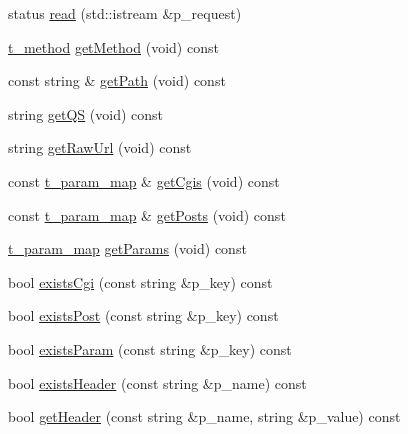 \begin{DoxyCompactItemize}
\item 
status \hyperlink{classxtd_1_1network_1_1http_1_1Request_a050758a8848fb4190b305d955760fd79}{read} (std\-::istream \&p\-\_\-request)
\item 
\hyperlink{classxtd_1_1network_1_1http_1_1Request_a789d6d688af4e63cc725542fc7925627}{t\-\_\-method} \hyperlink{classxtd_1_1network_1_1http_1_1Request_af06004afe64f465edfb281407b7f3600}{get\-Method} (void) const 
\item 
const string \& \hyperlink{classxtd_1_1network_1_1http_1_1Request_a0006f0a88dccabdafe9dfed3627730f6}{get\-Path} (void) const 
\item 
string \hyperlink{classxtd_1_1network_1_1http_1_1Request_ac9aeee4365089901bd216350fdcbe3a2}{get\-Q\-S} (void) const 
\item 
string \hyperlink{classxtd_1_1network_1_1http_1_1Request_a00428c206d17d2557d5ed3a46a2f139b}{get\-Raw\-Url} (void) const 
\item 
const \hyperlink{classxtd_1_1network_1_1http_1_1Request_a3cd6e9ac7c35897002582c4a3b84b17d}{t\-\_\-param\-\_\-map} \& \hyperlink{classxtd_1_1network_1_1http_1_1Request_a48687de33ff80c714d6bc0112aa23c56}{get\-Cgis} (void) const 
\item 
const \hyperlink{classxtd_1_1network_1_1http_1_1Request_a3cd6e9ac7c35897002582c4a3b84b17d}{t\-\_\-param\-\_\-map} \& \hyperlink{classxtd_1_1network_1_1http_1_1Request_a1a849dbe8e258e208325056ac46438c9}{get\-Posts} (void) const 
\item 
\hyperlink{classxtd_1_1network_1_1http_1_1Request_a3cd6e9ac7c35897002582c4a3b84b17d}{t\-\_\-param\-\_\-map} \hyperlink{classxtd_1_1network_1_1http_1_1Request_aac37ae370c601f66b17e1ef071081957}{get\-Params} (void) const 
\item 
bool \hyperlink{classxtd_1_1network_1_1http_1_1Request_a21fc278ee56175b527ae58c909ad97a3}{exists\-Cgi} (const string \&p\-\_\-key) const 
\item 
bool \hyperlink{classxtd_1_1network_1_1http_1_1Request_ae121fd7a302ea9bb1a3fe66f3cb7f696}{exists\-Post} (const string \&p\-\_\-key) const 
\item 
bool \hyperlink{classxtd_1_1network_1_1http_1_1Request_a8bc12470bb1a04d71d84ed1053551df9}{exists\-Param} (const string \&p\-\_\-key) const 
\item 
bool \hyperlink{classxtd_1_1network_1_1http_1_1Request_ad334cf225213389711b7524a2c637e38}{exists\-Header} (const string \&p\-\_\-name) const 
\item 
bool \hyperlink{classxtd_1_1network_1_1http_1_1Request_a99a0c9599f0d2bdc51f8e488fb4f78f4}{get\-Header} (const string \&p\-\_\-name, string \&p\-\_\-value) const 

\end{DoxyCompactItemize}
